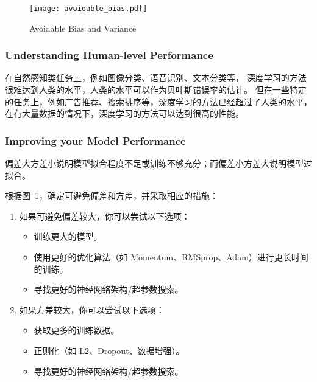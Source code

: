 \begin{figure}[h!bt]
    \centering
    \texttt{[image: avoidable\_bias.pdf]}
    \caption{Avoidable Bias and Variance}
    \label{fig:avoidable_bias}
\end{figure}

\subsubsection{Understanding Human-level Performance}

在自然感知类任务上，例如图像分类、语音识别、文本分类等，
深度学习的方法很难达到人类的水平，人类的水平可以作为贝叶斯错误率的估计。
但在一些特定的任务上，例如广告推荐、搜索排序等，深度学习的方法已经超过了人类的水平，
在有大量数据的情况下，深度学习的方法可以达到很高的性能。

\subsubsection{Improving your Model Performance}

偏差大方差小说明模型拟合程度不足或训练不够充分；而偏差小方差大说明模型过拟合。

根据图~\ref{fig:avoidable_bias}，确定可避免偏差和方差，并采取相应的措施：

\begin{enumerate}
    \item 如果可避免偏差较大，你可以尝试以下选项：
        \begin{itemize}
            \item 训练更大的模型。
            \item 使用更好的优化算法（如 Momentum、RMSprop、Adam）进行更长时间的训练。
            \item 寻找更好的神经网络架构/超参数搜索。
        \end{itemize}
    \item 如果方差较大，你可以尝试以下选项：
        \begin{itemize}
            \item 获取更多的训练数据。
            \item 正则化（如 L2、Dropout、数据增强）。
            \item 寻找更好的神经网络架构/超参数搜索。
        \end{itemize}
\end{enumerate}
